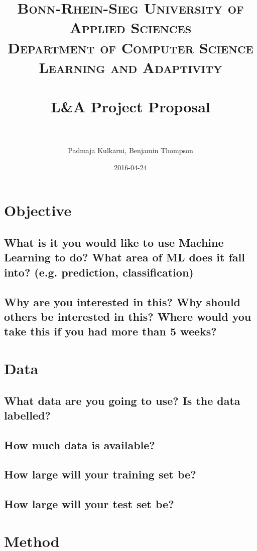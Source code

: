 \documentclass[paper=a4, fontsize=11pt]{scrartcl} %
\title{	
\normalfont \normalsize 
\textsc{Bonn-Rhein-Sieg University of Applied Sciences \\Department of Computer Science\\Learning and Adaptivity} \\ [10pt] %
\horrule{0.5pt} \\[0.4cm] %
\LARGE  L\&A Project Proposal\\ %
\horrule{2pt} \\[0.5cm] %
}
\date{2016-04-24}
\author{Padmaja Kulkarni, Benjamin Thompson} %
\begin{document}
\maketitle %

\section{Objective}

\subsection{What is it you would like to use Machine Learning to do? What area of ML does it fall into? (e.g. prediction, classification)}

\subsection{Why are you interested in this? Why should others be interested in this? Where would you take this if you had more than 5 weeks?}

\section{Data}

\subsection{What data are you going to use? Is the data labelled?}

\subsection{How much data is available?}

\subsection{How large will your training set be?}

\subsection{How large will your test set be?}

\section{Method}
\end{document}
